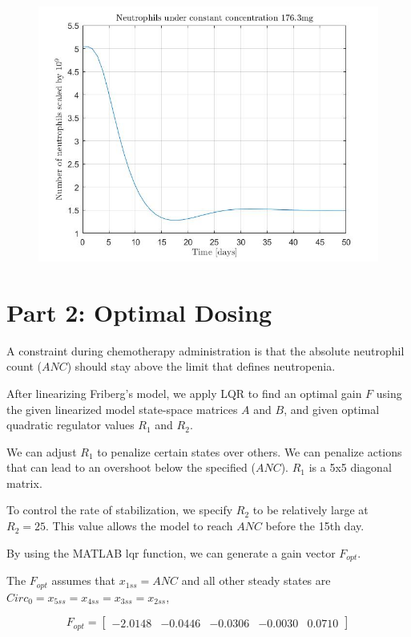 \documentclass[11pt]{article}
\begin{document}
\begin{figure}[H]
    \includegraphics[width=\textwidth]{p1image2.jpg}
\end{figure}

\section*{Part 2: Optimal Dosing}

A constraint during chemotherapy administration is that the absolute neutrophil count ($ANC$) should stay above the limit that defines neutropenia.

After linearizing Friberg's model, we apply LQR to find an optimal gain $F$ using the given linearized model state-space matrices $A$ and $B$, and given optimal quadratic regulator values $R_1$ and $R_2$. 

We can adjust $R_1$ to penalize certain states over others. We can penalize actions that can lead to an overshoot below the specified ($ANC$). $R_1$ is a 5x5 diagonal matrix.

To control the rate of stabilization, we specify $R_2$ to be relatively large at $R_2 = 25$. This value allows the model to reach $ANC$ before the 15th day.

By using the MATLAB lqr function, we can generate a gain vector $F_{opt}$.

The $F_{opt}$ assumes that $x_{1ss} = ANC$ and all other steady states are $Circ_0 = x_{5ss} = x_{4ss} = x_{3ss} = x_{2ss}$, 

$$
F_{opt} = \begin{bmatrix}
    -2.0148 & -0.0446 & -0.0306 & -0.0030 & 0.0710
\end{bmatrix}
$$
\end{document}
